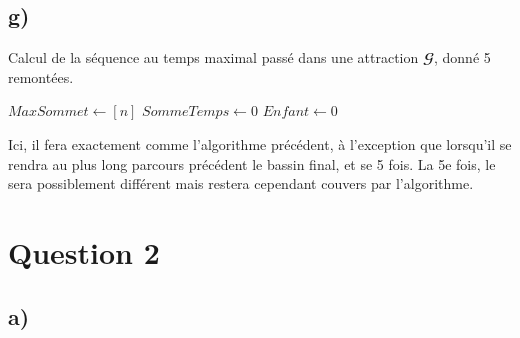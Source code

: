 \documentclass[11pt,a4paper, oneside, oldfontcommands]{memoir}
\newcommand{\G}{$\mathbfcal{G}$}
\begin{document}
\section{g)}
\IncMargin{1em}
\begin{algorithm}[H]

  \caption{Calcul de la séquence au temps maximal passé dans une attraction \G{}, donné 5 remontées.}
  \DontPrintSemicolon
  \LinesNumbered
  \SetAlgoLined

  $MaxSommet \leftarrow [n]$\;
  $SommeTemps \leftarrow 0$\;
  $Enfant \leftarrow 0$\;

  \;
\end{algorithm}
\DecMargin{1em}

  \BlankLine

  Ici, il fera exactement comme l'algorithme précédent, à l'exception que lorsqu'il se rendra au plus long parcours précédent le bassin final,
  et se 5 fois. La 5e fois, le sera possiblement différent mais restera cependant couvers par l'algorithme.

\chapter{Question 2}
\section{a)}
\end{document}
